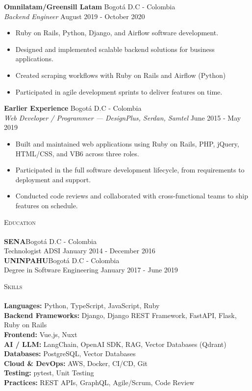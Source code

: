\documentclass[a4paper]{article}
\newcommand{\lineunder} {
    \vspace*{-8pt} \\
    \hspace*{-18pt} \hrulefill \\
}
\newcommand{\header} [1] {
    {\hspace*{-18pt}\vspace*{6pt} \textsc{#1}}
    \vspace*{-6pt} \lineunder
}
\begin{document}
\vspace*{-1mm}
\textbf{Omnilatam/Greensill Latam} \hfill Bogotá D.C - Colombia\\
\textit{Backend Engineer} \hfill August 2019 - October 2020\\
\vspace{-2mm}
\begin{itemize} \itemsep 0pt
	\item Ruby on Rails, Python, Django, and Airflow software development.
	\item Designed and implemented scalable backend solutions for business applications.
	\item Created scraping workflows with Ruby on Rails and Airflow (Python)
	\item Participated in agile development sprints to deliver features on time.
\end{itemize}
\vspace*{-1mm}
\textbf{Earlier Experience} \hfill Bogotá D.C - Colombia\\
\textit{Web Developer / Programmer — DesignPlus, Serdan, Samtel} \hfill June 2015 - May 2019\\
\vspace{-2mm}
\begin{itemize} \itemsep 0pt
	\item Built and maintained web applications using Ruby on Rails, PHP, jQuery, HTML/CSS, and VB6 across three roles.
	\item Participated in the full software development lifecycle, from requirements to deployment and support.
	\item Conducted code reviews and collaborated with cross-functional teams to ship features on schedule.
\end{itemize}

\header{Education}
\textbf{SENA}\hfill Bogotá D.C - Colombia\\
Technologist ADSI \hfill January 2014 - December 2016\\
\vspace{1mm}
\textbf{UNINPAHU}\hfill Bogotá D.C - Colombia\\
Degree in Software Engineering \hfill January 2017 - June 2019\\
\vspace{1mm}

\header{Skills}
\textbf{Languages:} Python, TypeScript, JavaScript, Ruby \\
\textbf{Backend Frameworks:} Django, Django REST Framework, FastAPI, Flask, Ruby on Rails \\
\textbf{Frontend:} Vue.js, Nuxt \\
\textbf{AI / LLM:} LangChain, OpenAI SDK, RAG, Vector Databases (Qdrant) \\
\textbf{Databases:} PostgreSQL, Vector Databases \\
\textbf{Cloud \& DevOps:} AWS, Docker, CI/CD, Git \\
\textbf{Testing:} pytest, Unit Testing \\
\textbf{Practices:} REST APIs, GraphQL, Agile/Scrum, Code Review \\
\vspace{1mm}
\end{document}
